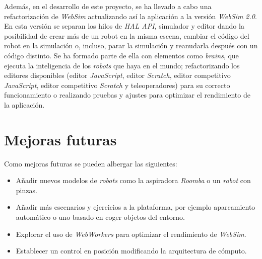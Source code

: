 Además, en el desarrollo de este proyecto, se ha llevado a cabo una refactorización de \textit{WebSim} actualizando así la aplicación a la versión \textit{WebSim 2.0}. En esta versión se separan los hilos de \textit{HAL API}, simulador y editor dando la posibilidad de crear más de un robot en la misma escena, cambiar el código del robot en la simulación o, incluso, parar la simulación y reanudarla después con un código distinto. Se ha formado parte de ella con elementos como \textit{brains}, que ejecuta la inteligencia de los \textit{robots} que haya en el mundo; refactorizando los editores disponibles (editor \textit{JavaScript}, editor \textit{Scratch}, editor competitivo \textit{JavaScript}, editor competitivo \textit{Scratch} y teleoperadores) para su correcto funcionamiento o realizando pruebas y ajustes para optimizar el rendimiento de la aplicación.

\section{Mejoras futuras}


Como mejoras futuras se pueden albergar las siguientes:
\begin{itemize}
    \item Añadir nuevos modelos de \textit{robots} como la aspiradora \textit{Roomba} o un \textit{robot} con pinzas. 
    \item Añadir más escenarios y ejercicios a la plataforma, por ejemplo aparcamiento automático o uno basado en coger objetos del entorno. 
    \item Explorar el uso de \textit{WebWorkers} para optimizar el rendimiento de \textit{WebSim}.
    \item Establecer un control en posición modificando la arquitectura de cómputo.
\end{itemize}